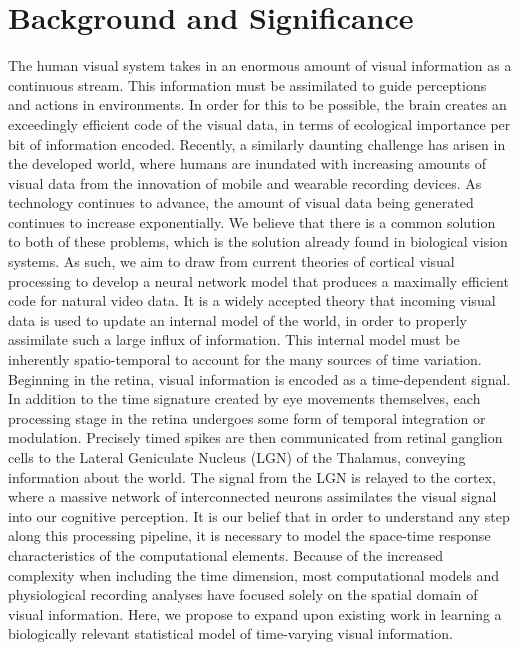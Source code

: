 \documentclass[smallextended]{svjour3}       %
\begin{document}
\section{Background and Significance} \label{background}
\noindent The human visual system takes in an enormous amount of visual information as a continuous stream. This information must be assimilated to guide perceptions and actions in environments. In order for this to be possible, the brain creates an exceedingly efficient code of the visual data, in terms of ecological importance per bit of information encoded. Recently, a similarly daunting challenge has arisen in the developed world, where humans are inundated with increasing amounts of visual data from the innovation of mobile and wearable recording devices. As technology continues to advance, the amount of visual data being generated continues to increase exponentially. We believe that there is a common solution to both of these problems, which is the solution already found in biological vision systems. As such, we aim to draw from current theories of cortical visual processing to develop a neural network model that produces a maximally efficient code for natural video data. It is a widely accepted theory that incoming visual data is used to update an internal model of the world, in order to properly assimilate such a large influx of information. This internal model must be inherently spatio-temporal to account for the many sources of time variation.\\

\noindent Beginning in the retina, visual information is encoded as a time-dependent signal. In addition to the time signature created by eye movements themselves, each processing stage in the retina undergoes some form of temporal integration or modulation. Precisely timed spikes are then communicated from retinal ganglion cells to the Lateral Geniculate Nucleus (LGN) of the Thalamus, conveying information about the world. The signal from the LGN is relayed to the cortex, where a massive network of interconnected neurons assimilates the visual signal into our cognitive perception. It is our belief that in order to understand any step along this processing pipeline, it is necessary to model the space-time response characteristics of the computational elements. Because of the increased complexity when including the time dimension, most computational models and physiological recording analyses have focused solely on the spatial domain of visual information. Here, we propose to expand upon existing work in learning a biologically relevant statistical model of time-varying visual information.
\end{document}
